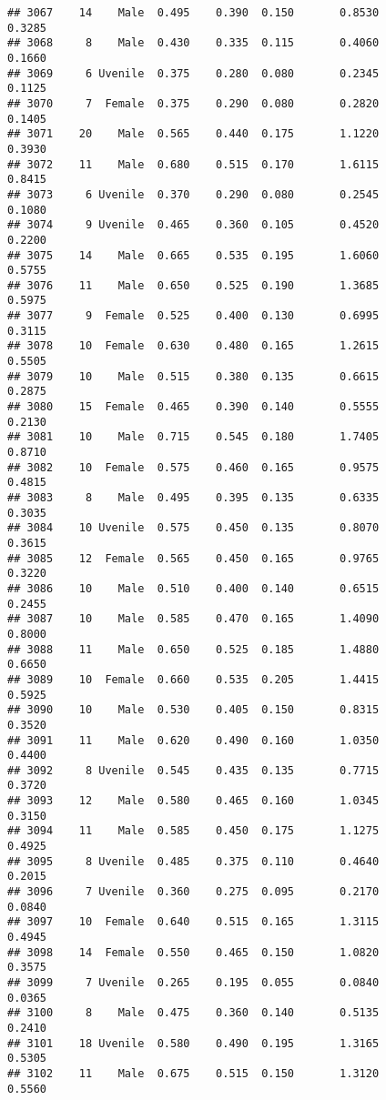 \documentclass[
]{article}
\begin{document}
\begin{verbatim}
## 3067    14    Male  0.495    0.390  0.150       0.8530         0.3285
## 3068     8    Male  0.430    0.335  0.115       0.4060         0.1660
## 3069     6 Uvenile  0.375    0.280  0.080       0.2345         0.1125
## 3070     7  Female  0.375    0.290  0.080       0.2820         0.1405
## 3071    20    Male  0.565    0.440  0.175       1.1220         0.3930
## 3072    11    Male  0.680    0.515  0.170       1.6115         0.8415
## 3073     6 Uvenile  0.370    0.290  0.080       0.2545         0.1080
## 3074     9 Uvenile  0.465    0.360  0.105       0.4520         0.2200
## 3075    14    Male  0.665    0.535  0.195       1.6060         0.5755
## 3076    11    Male  0.650    0.525  0.190       1.3685         0.5975
## 3077     9  Female  0.525    0.400  0.130       0.6995         0.3115
## 3078    10  Female  0.630    0.480  0.165       1.2615         0.5505
## 3079    10    Male  0.515    0.380  0.135       0.6615         0.2875
## 3080    15  Female  0.465    0.390  0.140       0.5555         0.2130
## 3081    10    Male  0.715    0.545  0.180       1.7405         0.8710
## 3082    10  Female  0.575    0.460  0.165       0.9575         0.4815
## 3083     8    Male  0.495    0.395  0.135       0.6335         0.3035
## 3084    10 Uvenile  0.575    0.450  0.135       0.8070         0.3615
## 3085    12  Female  0.565    0.450  0.165       0.9765         0.3220
## 3086    10    Male  0.510    0.400  0.140       0.6515         0.2455
## 3087    10    Male  0.585    0.470  0.165       1.4090         0.8000
## 3088    11    Male  0.650    0.525  0.185       1.4880         0.6650
## 3089    10  Female  0.660    0.535  0.205       1.4415         0.5925
## 3090    10    Male  0.530    0.405  0.150       0.8315         0.3520
## 3091    11    Male  0.620    0.490  0.160       1.0350         0.4400
## 3092     8 Uvenile  0.545    0.435  0.135       0.7715         0.3720
## 3093    12    Male  0.580    0.465  0.160       1.0345         0.3150
## 3094    11    Male  0.585    0.450  0.175       1.1275         0.4925
## 3095     8 Uvenile  0.485    0.375  0.110       0.4640         0.2015
## 3096     7 Uvenile  0.360    0.275  0.095       0.2170         0.0840
## 3097    10  Female  0.640    0.515  0.165       1.3115         0.4945
## 3098    14  Female  0.550    0.465  0.150       1.0820         0.3575
## 3099     7 Uvenile  0.265    0.195  0.055       0.0840         0.0365
## 3100     8    Male  0.475    0.360  0.140       0.5135         0.2410
## 3101    18 Uvenile  0.580    0.490  0.195       1.3165         0.5305
## 3102    11    Male  0.675    0.515  0.150       1.3120         0.5560

\end{verbatim}
\end{document}
